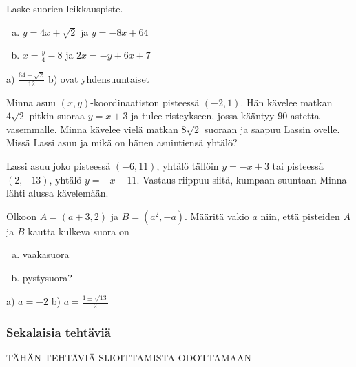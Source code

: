 \begin{tehtavasivu}
\begin {tehtava}
Laske suorien leikkauspiste.
\begin{enumerate} [a)]
\item $y=4x+\sqrt{2}$ ja $y=-8x+64$
\item $x=\frac{y}{4}-8$ ja $2x=-y+6x+7$
\end{enumerate}
\begin {vastaus}
a) $\frac{64-\sqrt{2}}{12}$ b) ovat yhdensuuntaiset
\end {vastaus}
\end {tehtava}

\begin {tehtava}
Minna asuu $(x,y)$-koordinaatiston pisteessä $(-2,1)$. Hän kävelee matkan $4\sqrt{2}$ pitkin suoraa $y=x+3$ ja tulee risteykseen, jossa kääntyy $90$ astetta vasemmalle. Minna kävelee vielä matkan $8\sqrt{2}$ suoraan ja saapuu Lassin ovelle. Missä Lassi asuu ja mikä on hänen asuintiensä yhtälö?
\begin {vastaus}
Lassi asuu joko pisteessä $(-6,11)$, yhtälö tällöin $y=-x+3$ tai pisteessä $(2,-13)$, yhtälö $y=-x-11$. Vastaus riippuu siitä, kumpaan suuntaan Minna lähti alussa kävelemään.
\end {vastaus}
\end {tehtava}

\begin {tehtava}
Olkoon $A=(a+3,2)$ ja $B=(a^2,-a)$. Määritä vakio $a$ niin, että pisteiden $A$ ja $B$ kautta kulkeva suora on
\begin{enumerate} [a)]
\item vaakasuora
\item pystysuora?
\end{enumerate}
\begin {vastaus}
a) $a=-2$ b) $a=\frac{1\pm\sqrt{13}}{2} $
\end {vastaus}
\end {tehtava}

\subsubsection*{Sekalaisia tehtäviä}

TÄHÄN TEHTÄVIÄ SIJOITTAMISTA ODOTTAMAAN

\end{tehtavasivu}

